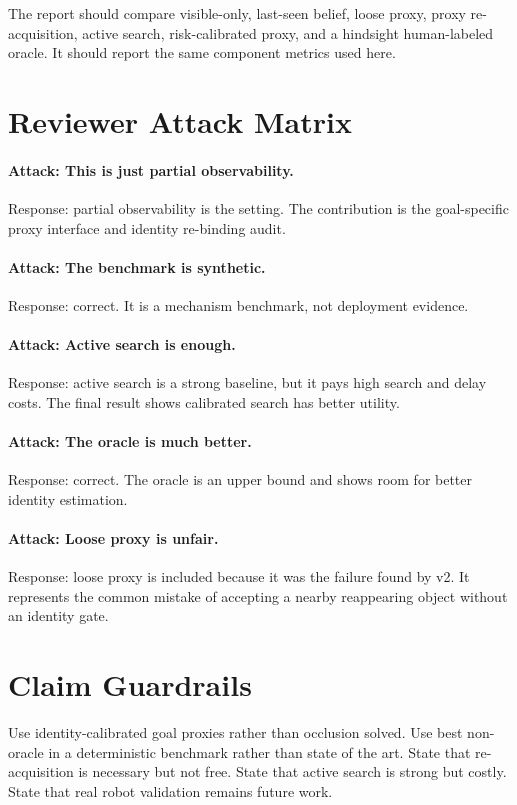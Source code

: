 The report should compare visible-only, last-seen belief, loose proxy, proxy re-acquisition, active search, risk-calibrated proxy, and a hindsight human-labeled oracle. It should report the same component metrics used here.

\section{Reviewer Attack Matrix}

\paragraph{Attack: This is just partial observability.}
Response: partial observability is the setting. The contribution is the goal-specific proxy interface and identity re-binding audit.

\paragraph{Attack: The benchmark is synthetic.}
Response: correct. It is a mechanism benchmark, not deployment evidence.

\paragraph{Attack: Active search is enough.}
Response: active search is a strong baseline, but it pays high search and delay costs. The final result shows calibrated search has better utility.

\paragraph{Attack: The oracle is much better.}
Response: correct. The oracle is an upper bound and shows room for better identity estimation.

\paragraph{Attack: Loose proxy is unfair.}
Response: loose proxy is included because it was the failure found by v2. It represents the common mistake of accepting a nearby reappearing object without an identity gate.

\section{Claim Guardrails}

Use identity-calibrated goal proxies rather than occlusion solved. Use best non-oracle in a deterministic benchmark rather than state of the art. State that re-acquisition is necessary but not free. State that active search is strong but costly. State that real robot validation remains future work.

